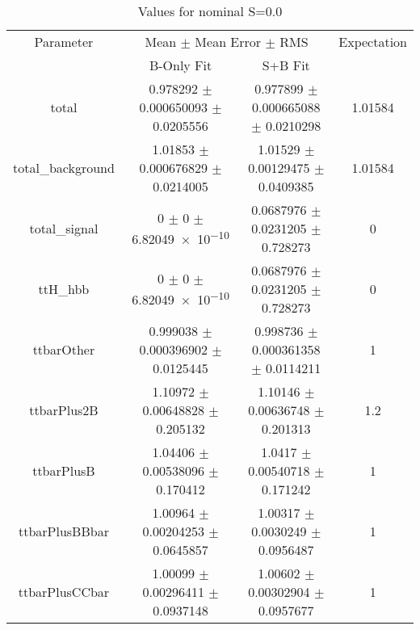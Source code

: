 \begin{table}
\centering
\caption{Values for nominal S=0.0}
\begin{tabular}{cccc}
\toprule
Parameter & \multicolumn{2}{c}{Mean $\pm$ Mean Error $\pm$ RMS} & Expectation\\
 & B-Only Fit & S+B Fit & \\
\midrule
total & \num{0.978292} $\pm$ \num{0.000650093} $\pm$ \num{0.0205556} & \num{0.977899} $\pm$ \num{0.000665088} $\pm$ \num{0.0210298} & \num{1.01584}\\
total\_background & \num{1.01853} $\pm$ \num{0.000676829} $\pm$ \num{0.0214005} & \num{1.01529} $\pm$ \num{0.00129475} $\pm$ \num{0.0409385} & \num{1.01584}\\
total\_signal & \num{0} $\pm$ \num{0} $\pm$ \num{6.82049e-10} & \num{0.0687976} $\pm$ \num{0.0231205} $\pm$ \num{0.728273} & \num{0}\\
ttH\_hbb & \num{0} $\pm$ \num{0} $\pm$ \num{6.82049e-10} & \num{0.0687976} $\pm$ \num{0.0231205} $\pm$ \num{0.728273} & \num{0}\\
ttbarOther & \num{0.999038} $\pm$ \num{0.000396902} $\pm$ \num{0.0125445} & \num{0.998736} $\pm$ \num{0.000361358} $\pm$ \num{0.0114211} & \num{1}\\
ttbarPlus2B & \num{1.10972} $\pm$ \num{0.00648828} $\pm$ \num{0.205132} & \num{1.10146} $\pm$ \num{0.00636748} $\pm$ \num{0.201313} & \num{1.2}\\
ttbarPlusB & \num{1.04406} $\pm$ \num{0.00538096} $\pm$ \num{0.170412} & \num{1.0417} $\pm$ \num{0.00540718} $\pm$ \num{0.171242} & \num{1}\\
ttbarPlusBBbar & \num{1.00964} $\pm$ \num{0.00204253} $\pm$ \num{0.0645857} & \num{1.00317} $\pm$ \num{0.0030249} $\pm$ \num{0.0956487} & \num{1}\\
ttbarPlusCCbar & \num{1.00099} $\pm$ \num{0.00296411} $\pm$ \num{0.0937148} & \num{1.00602} $\pm$ \num{0.00302904} $\pm$ \num{0.0957677} & \num{1}\\
\bottomrule
\end{tabular}
\end{table}